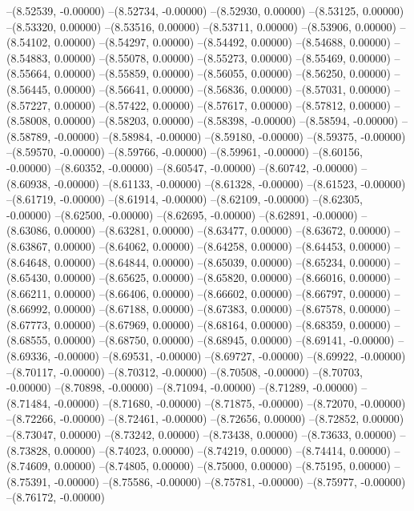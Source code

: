 --(8.52539, -0.00000)
--(8.52734, -0.00000)
--(8.52930, 0.00000)
--(8.53125, 0.00000)
--(8.53320, 0.00000)
--(8.53516, 0.00000)
--(8.53711, 0.00000)
--(8.53906, 0.00000)
--(8.54102, 0.00000)
--(8.54297, 0.00000)
--(8.54492, 0.00000)
--(8.54688, 0.00000)
--(8.54883, 0.00000)
--(8.55078, 0.00000)
--(8.55273, 0.00000)
--(8.55469, 0.00000)
--(8.55664, 0.00000)
--(8.55859, 0.00000)
--(8.56055, 0.00000)
--(8.56250, 0.00000)
--(8.56445, 0.00000)
--(8.56641, 0.00000)
--(8.56836, 0.00000)
--(8.57031, 0.00000)
--(8.57227, 0.00000)
--(8.57422, 0.00000)
--(8.57617, 0.00000)
--(8.57812, 0.00000)
--(8.58008, 0.00000)
--(8.58203, 0.00000)
--(8.58398, -0.00000)
--(8.58594, -0.00000)
--(8.58789, -0.00000)
--(8.58984, -0.00000)
--(8.59180, -0.00000)
--(8.59375, -0.00000)
--(8.59570, -0.00000)
--(8.59766, -0.00000)
--(8.59961, -0.00000)
--(8.60156, -0.00000)
--(8.60352, -0.00000)
--(8.60547, -0.00000)
--(8.60742, -0.00000)
--(8.60938, -0.00000)
--(8.61133, -0.00000)
--(8.61328, -0.00000)
--(8.61523, -0.00000)
--(8.61719, -0.00000)
--(8.61914, -0.00000)
--(8.62109, -0.00000)
--(8.62305, -0.00000)
--(8.62500, -0.00000)
--(8.62695, -0.00000)
--(8.62891, -0.00000)
--(8.63086, 0.00000)
--(8.63281, 0.00000)
--(8.63477, 0.00000)
--(8.63672, 0.00000)
--(8.63867, 0.00000)
--(8.64062, 0.00000)
--(8.64258, 0.00000)
--(8.64453, 0.00000)
--(8.64648, 0.00000)
--(8.64844, 0.00000)
--(8.65039, 0.00000)
--(8.65234, 0.00000)
--(8.65430, 0.00000)
--(8.65625, 0.00000)
--(8.65820, 0.00000)
--(8.66016, 0.00000)
--(8.66211, 0.00000)
--(8.66406, 0.00000)
--(8.66602, 0.00000)
--(8.66797, 0.00000)
--(8.66992, 0.00000)
--(8.67188, 0.00000)
--(8.67383, 0.00000)
--(8.67578, 0.00000)
--(8.67773, 0.00000)
--(8.67969, 0.00000)
--(8.68164, 0.00000)
--(8.68359, 0.00000)
--(8.68555, 0.00000)
--(8.68750, 0.00000)
--(8.68945, 0.00000)
--(8.69141, -0.00000)
--(8.69336, -0.00000)
--(8.69531, -0.00000)
--(8.69727, -0.00000)
--(8.69922, -0.00000)
--(8.70117, -0.00000)
--(8.70312, -0.00000)
--(8.70508, -0.00000)
--(8.70703, -0.00000)
--(8.70898, -0.00000)
--(8.71094, -0.00000)
--(8.71289, -0.00000)
--(8.71484, -0.00000)
--(8.71680, -0.00000)
--(8.71875, -0.00000)
--(8.72070, -0.00000)
--(8.72266, -0.00000)
--(8.72461, -0.00000)
--(8.72656, 0.00000)
--(8.72852, 0.00000)
--(8.73047, 0.00000)
--(8.73242, 0.00000)
--(8.73438, 0.00000)
--(8.73633, 0.00000)
--(8.73828, 0.00000)
--(8.74023, 0.00000)
--(8.74219, 0.00000)
--(8.74414, 0.00000)
--(8.74609, 0.00000)
--(8.74805, 0.00000)
--(8.75000, 0.00000)
--(8.75195, 0.00000)
--(8.75391, -0.00000)
--(8.75586, -0.00000)
--(8.75781, -0.00000)
--(8.75977, -0.00000)
--(8.76172, -0.00000)
